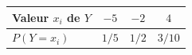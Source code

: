 \begingroup\renewcommand{\arraystretch}{1.35}
\begin{tabular}{@{}lccc@{}}\toprule
Valeur $x_i$ de $Y$ & $-5$ & $-2$ & $4$\\\midrule
$P(Y=x_i)$ & $1/5$ & $1/2$ & $3/10$\\
\bottomrule\end{tabular}\endgroup

\par\smallskip{}
